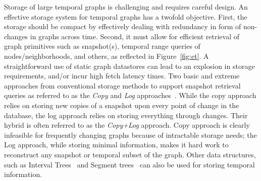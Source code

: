 \documentclass{svjour3}
\begin{document}
Storage of large temporal graphs is challenging and requires careful design. An effective storage system for temporal graphs has a twofold objective. First, the storage should be compact by effectively dealing with redundancy in form of non-changes in graphs across time. Second, it must allow for efficient retrieval of graph primitives such as snapshot(s), temporal range queries of nodes/neighborhoods, and others, as reflected in Figure~\ref{fig:et}. A straightforward use of static graph datastores can lead to an explosion in storage requirements, and/or incur high fetch latency times.  
Two basic and extreme approaches from conventional storage methods 
to support snapshot retrieval queries as referred to as the \textit{Copy} and \textit{Log} approaches~\cite{Salzberg1999}. While the copy approach relies on storing new copies of a snapshot upon every point of change in the database, the log approach relies on storing everything through changes. Their hybrid is often referred to as the \textit{Copy+Log} approach. Copy approach is clearly infeasible for frequently changing graphs because of intractable storage needs; the Log approach, while storing minimal information, makes it hard work to reconstruct any snapshot or temporal subset of the graph. %
Other data structures, such as Interval Trees~\cite{arge1996optimal} and Segment trees~\cite{Blankenagel1994} can also be used for storing temporal information. 
\end{document}
